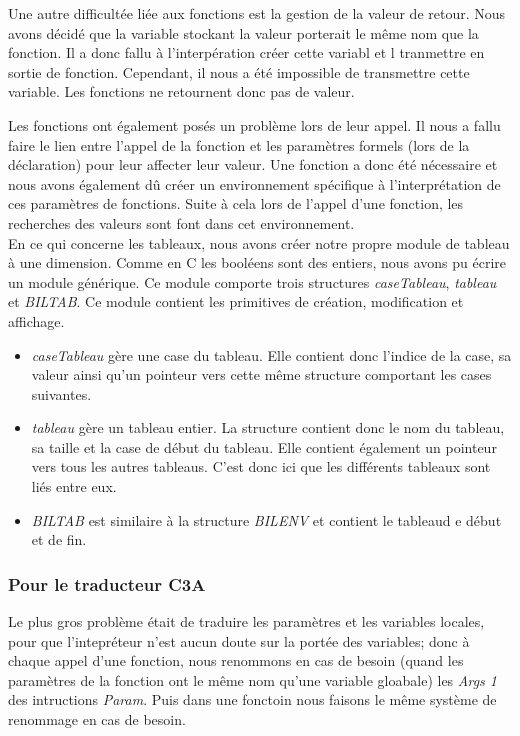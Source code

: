 \documentclass[10pt,a4paper]{article}
\begin{document}
Une autre difficultée liée aux fonctions est la gestion de la valeur de retour. Nous avons décidé que la variable stockant la valeur porterait le même nom que la fonction. Il a donc fallu à l'interpération créer cette variabl et l tranmettre en sortie de fonction. Cependant, il nous a été impossible de transmettre cette variable. Les fonctions ne retournent donc pas de valeur.

Les fonctions ont également posés un problème lors de leur appel. Il nous a fallu faire le lien entre l'appel de la fonction et les paramètres formels (lors de la déclaration) pour leur affecter leur valeur. Une fonction a donc été nécessaire et nous avons également dû créer un environnement spécifique à l'interprétation de ces paramètres de fonctions. Suite à cela lors de l'appel d'une fonction, les recherches des valeurs sont font dans cet environnement.\\

En ce qui concerne les tableaux, nous avons créer notre propre module de tableau à une dimension. Comme en C les booléens sont des entiers, nous avons pu écrire un module générique. Ce module comporte trois structures \textit{caseTableau}, \textit{tableau} et \textit{BILTAB}.
Ce module contient les primitives de création, modification et affichage.\\

\begin{itemize}
	\item \textit{caseTableau} gère une case du tableau. Elle contient donc l'indice de la case, sa valeur ainsi qu'un pointeur vers cette même structure comportant les cases suivantes.
	\item \textit{tableau} gère un tableau entier. La structure contient donc le nom du tableau, sa taille et la case de début du tableau. Elle contient également un pointeur vers tous les autres tableaus. C'est donc ici que les différents tableaux sont liés entre eux.
	\item \textit{BILTAB} est similaire à la structure \textit{BILENV} et contient le tableaud e début et de fin.
\end{itemize}




\subsubsection{Pour le traducteur C3A}
Le plus gros problème était de traduire les paramètres et les variables locales, pour que l'intepréteur n'est aucun doute sur la portée des variables; donc à chaque appel d'une fonction, nous renommons en cas de besoin (quand les paramètres de la fonction ont le même nom qu'une variable gloabale) les \textit{Args 1} des intructions \textit{Param}. Puis dans une fonctoin nous faisons le même système de renommage en cas de besoin.
\end{document}
